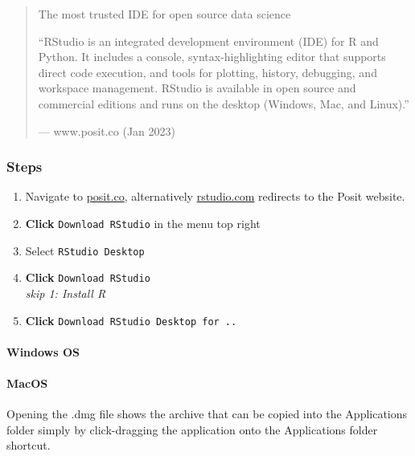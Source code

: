 \documentclass[
]{book}
\providecommand{\tightlist}{%
  \setlength{\itemsep}{0pt}\setlength{\parskip}{0pt}}
\begin{document}
\begin{quote}
The most trusted IDE for open source data science

``RStudio is an integrated development environment (IDE) for R and Python. It includes a console, syntax-highlighting editor that supports direct code execution, and tools for plotting, history, debugging, and workspace management. RStudio is available in open source and commercial editions and runs on the desktop (Windows, Mac, and Linux).''

--- www.posit.co (Jan 2023)
\end{quote}

\hypertarget{steps-1}{%
\subsubsection*{Steps}\label{steps-1}}

\begin{enumerate}
\def\labelenumi{\arabic{enumi}.}
\tightlist
\item
  Navigate to \href{https://posit.co/}{posit.co}, alternatively \href{https://rstudio.com/}{rstudio.com} redirects to the Posit website.
\item
  \textbf{Click} \texttt{Download\ RStudio} in the menu top right
\item
  Select \texttt{RStudio\ Desktop}
\item
  \textbf{Click} \texttt{Download\ RStudio}\\
  \emph{skip 1: Install R}
\item
  \textbf{Click} \texttt{Download\ RStudio\ Desktop\ for\ ..}
\end{enumerate}

\hypertarget{windows-os-1}{%
\paragraph*{Windows OS}\label{windows-os-1}}

\hypertarget{macos-1}{%
\paragraph*{MacOS}\label{macos-1}}

Opening the .dmg file shows the archive that can be copied into the Applications folder simply by click-dragging the application onto the Applications folder shortcut.
\end{document}
